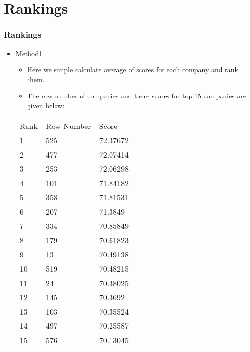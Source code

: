 \documentclass[pdf]{beamer}
\begin{document}
\section{Rankings}
\begin{frame}
	\frametitle{Rankings}
	\begin{itemize} 
		\subsection{Method1}
			\item Method1
			\begin{itemize} 
				\item Here we simple calculate average of scores for each company and rank them.
				\item The row number of companies and there scores for top 15 companies are given below:
			\end{itemize}
			\begin{tabular}{p{3cm} p{3cm} p{3cm}}
				Rank & Row Number & Score \\
				1 & 525 & 72.37672\\
				2 & 477 & 72.07414 \\
				3 & 253 & 72.06298 \\
				4 & 101 & 71.84182 \\
				5 & 358 & 71.81531 \\
				6 & 207 & 71.3849 \\
				7 & 334 & 70.85849 \\
				8 & 179 & 70.61823 \\
				9 & 13 & 70.49138 \\
				10 & 519 & 70.48215 \\
				11 & 24 & 70.38025 \\
				12 & 145 & 70.3692 \\
				13 & 103 & 70.35524 \\
				14 & 497 & 70.25587 \\
				15 & 576 & 70.13045 \\
			\end{tabular}
	\end{itemize}
\end{frame}
\end{document}
